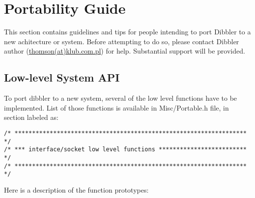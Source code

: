 \section{Portability Guide}

This section contains guidelines and tips for people intending to port
Dibbler to a new achitecture or system. Before attempting to do so,
please contact Dibbler author
(\href{mailto:thomson(at)klub.com.pl}{thomson(at)klub.com.pl})
for help. Substantial support will be provided.

\subsection{Low-level System API}

To port dibbler to a new system, several of the low level functions have to
be implemented. List of those functions is available in Misc/Portable.h
file, in section labeled as:

\begin{verbatim}
/* ****************************************************************** */
/* *** interface/socket low level functions ************************* */
/* ****************************************************************** */
\end{verbatim}

Here is a description of the function prototypes:

